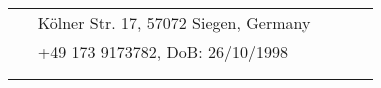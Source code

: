 \documentclass[10pt]{article} %
\begin{document}
\begin{paracol}{2}


\switchcolumn %


\parbox[top][0.12\textheight][c]{\linewidth}{ %
	\vspace{-0.04\textheight} %
	\colorbox{shade}{ %
		\begin{supertabular}{p{0.05\linewidth}|p{0.795\linewidth}} %
            \raisebox{-1pt}{\faHome} & K\"{o}lner Str. 17, 57072 Siegen, Germany \\ %
			\raisebox{-1pt}{\faPhone} & +49 173 9173782, DoB: 26/10/1998 \\ %
            \raisebox{0pt}{\small\faEnvelope} & \\%
            \raisebox{0pt}{\faGithub} & \\ %
		\end{supertabular}
	}
}



\end{paracol}
\end{document}
